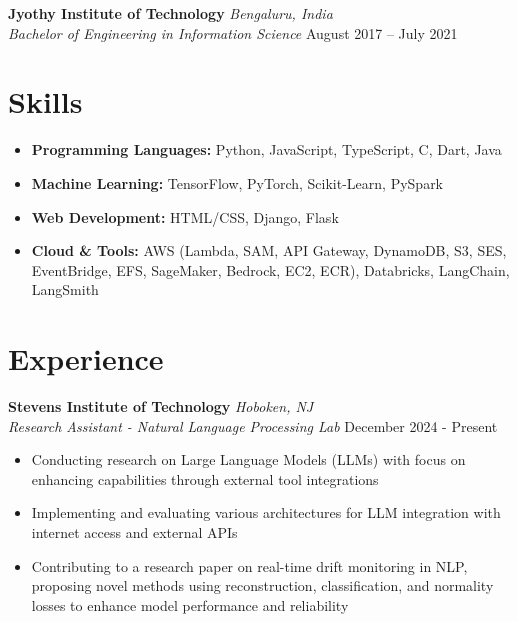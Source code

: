 \documentclass[11pt,a4paper]{article}
\begin{document}
\vspace{0.7em}
\noindent\textbf{Jyothy Institute of Technology} \hfill \textit{Bengaluru, India}\\
\textit{Bachelor of Engineering in Information Science} \hfill August 2017 – July 2021\\
\vspace{-0.5em}
\section*{Skills}
\begin{itemize}[noitemsep,topsep=2pt]
    \item \textbf{Programming Languages:} Python, JavaScript, TypeScript, C, Dart, Java
    \item \textbf{Machine Learning:} TensorFlow, PyTorch, Scikit-Learn, PySpark
    \item \textbf{Web Development:} HTML/CSS, Django, Flask
    \item \textbf{Cloud \& Tools:} AWS (Lambda, SAM, API Gateway, DynamoDB, S3, SES, EventBridge, EFS, SageMaker, Bedrock, EC2, ECR), Databricks, LangChain, LangSmith
\end{itemize}

\section*{Experience}
\noindent\textbf{Stevens Institute of Technology} \hfill \textit{Hoboken, NJ}\\
\textit{Research Assistant - Natural Language Processing Lab} \hfill December 2024 - Present
\begin{itemize}[noitemsep,topsep=2pt]
    \item Conducting research on Large Language Models (LLMs) with focus on enhancing capabilities through external tool integrations
    \item Implementing and evaluating various architectures for LLM integration with internet access and external APIs
    \item Contributing to a research paper on real-time drift monitoring in NLP, proposing novel methods using reconstruction, classification, and normality losses to enhance model performance and reliability
\end{itemize}
\vspace{-0.3em}
\end{document}
